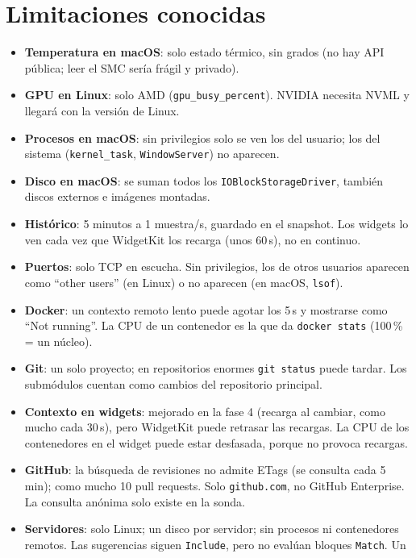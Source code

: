 \documentclass[11pt,a4paper]{article}
\begin{document}
\section{Limitaciones conocidas}
\begin{itemize}
  \item \textbf{Temperatura en macOS}: solo estado térmico, sin
    grados (no hay API pública; leer el SMC sería frágil y privado).
  \item \textbf{GPU en Linux}: solo AMD (\texttt{gpu\_busy\_percent}).
    NVIDIA necesita NVML y llegará con la versión de Linux.
  \item \textbf{Procesos en macOS}: sin privilegios solo se ven los
    del usuario; los del sistema (\texttt{kernel\_task},
    \texttt{WindowServer}) no aparecen.
  \item \textbf{Disco en macOS}: se suman todos los
    \texttt{IOBlockStorageDriver}, también discos externos e imágenes
    montadas.
  \item \textbf{Histórico}: 5 minutos a 1 muestra/s, guardado en el
    snapshot. Los widgets lo ven cada vez que WidgetKit los recarga
    (unos 60\,s), no en continuo.
  \item \textbf{Puertos}: solo TCP en escucha. Sin privilegios, los
    de otros usuarios aparecen como ``other users'' (en Linux) o no
    aparecen (en macOS, \texttt{lsof}).
  \item \textbf{Docker}: un contexto remoto lento puede agotar los 5\,s
    y mostrarse como ``Not running''. La CPU de un contenedor es la
    que da \texttt{docker stats} (100\,\% = un núcleo).
  \item \textbf{Git}: un solo proyecto; en repositorios enormes
    \texttt{git status} puede tardar. Los submódulos cuentan como
    cambios del repositorio principal.
  \item \textbf{Contexto en widgets}: mejorado en la fase 4 (recarga
    al cambiar, como mucho cada 30\,s), pero WidgetKit puede retrasar
    las recargas. La CPU de los contenedores en el widget puede estar
    desfasada, porque no provoca recargas.
  \item \textbf{GitHub}: la búsqueda de revisiones no admite ETags
    (se consulta cada 5\,min); como mucho 10 pull requests. Solo
    \texttt{github.com}, no GitHub Enterprise. La consulta anónima
    solo existe en la sonda.
  \item \textbf{Servidores}: solo Linux; un disco por servidor; sin
    procesos ni contenedores remotos. Las sugerencias siguen
    \texttt{Include}, pero no evalúan bloques \texttt{Match}. Un

\end{itemize}
\end{document}
